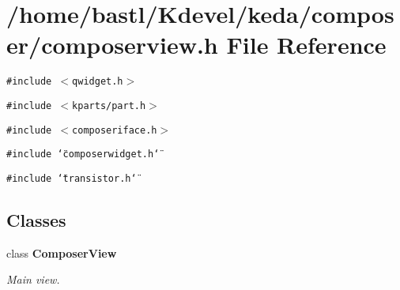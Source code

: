 \section{/home/bastl/Kdevel/keda/composer/composerview.h File Reference}
\label{composerview_8h}
{\tt \#include $<$qwidget.h$>$}\par
{\tt \#include $<$kparts/part.h$>$}\par
{\tt \#include $<$composeriface.h$>$}\par
{\tt \#include \char`\"{}composerwidget.h\char`\"{}}\par
{\tt \#include \char`\"{}transistor.h\char`\"{}}\par
\subsection*{Classes}
\begin{CompactItemize}
\item 
class {\bf Composer\-View}
\begin{CompactList}\small\item\em Main view. \item\end{CompactList}\end{CompactItemize}
